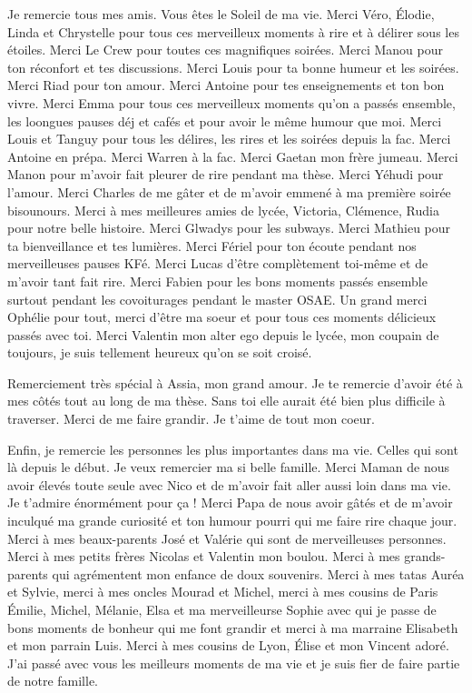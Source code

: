 Je remercie tous mes amis. Vous êtes le Soleil de ma vie. Merci Véro, Élodie, Linda et Chrystelle pour tous ces merveilleux moments à rire et à délirer sous les étoiles. Merci Le Crew pour toutes ces magnifiques soirées. Merci Manou pour ton réconfort et tes discussions. Merci Louis pour ta bonne humeur et les soirées. Merci Riad pour ton amour. Merci Antoine pour tes enseignements et ton bon vivre. Merci Emma pour tous ces merveilleux moments qu'on a passés ensemble, les loongues pauses déj et cafés et pour avoir le même humour que moi. Merci Louis et Tanguy pour tous les délires, les rires et les soirées depuis la fac. Merci Antoine en prépa. Merci Warren à la fac. Merci Gaetan mon frère jumeau. Merci Manon pour m'avoir fait pleurer de rire pendant ma thèse. Merci Yéhudi pour l'amour. Merci Charles de me gâter et de m'avoir emmené à ma première soirée bisounours. Merci à mes meilleures amies de lycée, Victoria, Clémence, Rudia pour notre belle histoire. Merci Glwadys pour les subways. Merci Mathieu pour ta bienveillance et tes lumières. Merci Fériel pour ton écoute pendant nos merveilleuses pauses KFé. Merci Lucas d'être complètement toi-même et de m'avoir tant fait rire. Merci Fabien pour les bons moments passés ensemble surtout pendant les covoiturages pendant le master OSAE. Un grand merci Ophélie pour tout, merci d'être ma soeur et pour tous ces moments délicieux passés avec toi. Merci Valentin mon alter ego depuis le lycée, mon coupain de toujours, je suis tellement heureux qu'on se soit croisé.

Remerciement très spécial à Assia, mon grand amour. Je te remercie d'avoir été à mes côtés tout au long de ma thèse. Sans toi elle aurait été bien plus difficile à traverser. Merci de me faire grandir. Je t'aime de tout mon coeur.

Enfin, je remercie les personnes les plus importantes dans ma vie. Celles qui sont là depuis le début. Je veux remercier ma si belle famille. Merci Maman de nous avoir élevés toute seule avec Nico et de m'avoir fait aller aussi loin dans ma vie. Je t'admire énormément pour ça ! Merci Papa de nous avoir gâtés et de m'avoir inculqué ma grande curiosité et ton humour pourri qui me faire rire chaque jour. Merci à mes beaux-parents José et Valérie qui sont de merveilleuses personnes. Merci à mes petits frères Nicolas et Valentin mon boulou. Merci à mes grands-parents qui agrémentent mon enfance de doux souvenirs. Merci à mes tatas Auréa et Sylvie, merci à mes oncles Mourad et Michel, merci à mes cousins de Paris Émilie, Michel, Mélanie, Elsa et ma merveilleurse Sophie avec qui je passe de bons moments de bonheur qui me font grandir et merci à ma marraine Elisabeth et mon parrain Luis. Merci à mes cousins de Lyon, Élise et mon Vincent adoré. J'ai passé avec vous les meilleurs moments de ma vie et je suis fier de faire partie de notre famille.
